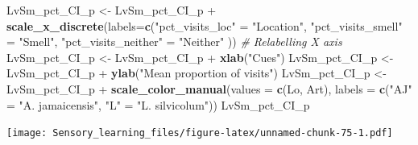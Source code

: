 \documentclass[]{article}
\newenvironment{Shaded}{\begin{snugshade}}{\end{snugshade}}
\newcommand{\KeywordTok}[1]{\textcolor[rgb]{0.13,0.29,0.53}{\textbf{{#1}}}}
\newcommand{\DataTypeTok}[1]{\textcolor[rgb]{0.13,0.29,0.53}{{#1}}}
\newcommand{\StringTok}[1]{\textcolor[rgb]{0.31,0.60,0.02}{{#1}}}
\newcommand{\CommentTok}[1]{\textcolor[rgb]{0.56,0.35,0.01}{\textit{{#1}}}}
\newcommand{\NormalTok}[1]{{#1}}
\begin{document}
\begin{Shaded}
\begin{Highlighting}[]
\NormalTok{LvSm_pct_CI_p <-}\StringTok{ }\NormalTok{LvSm_pct_CI_p +}\StringTok{ }\KeywordTok{scale_x_discrete}\NormalTok{(}\DataTypeTok{labels=}\KeywordTok{c}\NormalTok{(}\StringTok{"pct_visits_loc"} \NormalTok{=}\StringTok{ "Location"}\NormalTok{, }\StringTok{"pct_visits_smell"} \NormalTok{=}\StringTok{ "Smell"}\NormalTok{,}
                              \StringTok{"pct_visits_neither"} \NormalTok{=}\StringTok{ "Neither"} \NormalTok{))  }\CommentTok{# Relabelling X axis}
\NormalTok{LvSm_pct_CI_p <-}\StringTok{ }\NormalTok{LvSm_pct_CI_p +}\StringTok{ }\KeywordTok{xlab}\NormalTok{(}\StringTok{"Cues"}\NormalTok{)}
\NormalTok{LvSm_pct_CI_p <-}\StringTok{ }\NormalTok{LvSm_pct_CI_p +}\StringTok{ }\KeywordTok{ylab}\NormalTok{(}\StringTok{"Mean proportion of visits"}\NormalTok{)}
\NormalTok{LvSm_pct_CI_p <-}\StringTok{ }\NormalTok{LvSm_pct_CI_p +}\StringTok{ }\KeywordTok{scale_color_manual}\NormalTok{(}\DataTypeTok{values =} \KeywordTok{c}\NormalTok{(Lo, Art), }\DataTypeTok{labels =} \KeywordTok{c}\NormalTok{(}\StringTok{"AJ"} \NormalTok{=}\StringTok{ "A. jamaicensis"}\NormalTok{, }\StringTok{"L"} \NormalTok{=}\StringTok{ "L. silvicolum"}\NormalTok{))}
\NormalTok{LvSm_pct_CI_p                    }
\end{Highlighting}
\end{Shaded}

\texttt{[image: Sensory\_learning\_files/figure-latex/unnamed-chunk-75-1.pdf]}
\end{document}
